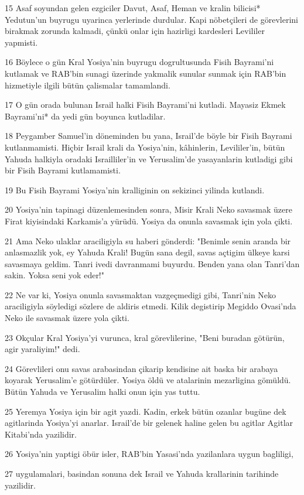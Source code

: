 \par 15 Asaf soyundan gelen ezgiciler Davut, Asaf, Heman ve kralin bilicisi* Yedutun'un buyrugu uyarinca yerlerinde durdular. Kapi nöbetçileri de görevlerini birakmak zorunda kalmadi, çünkü onlar için hazirligi kardesleri Levililer yapmisti.
\par 16 Böylece o gün Kral Yosiya'nin buyrugu dogrultusunda Fisih Bayrami'ni kutlamak ve RAB'bin sunagi üzerinde yakmalik sunular sunmak için RAB'bin hizmetiyle ilgili bütün çalismalar tamamlandi.
\par 17 O gün orada bulunan Israil halki Fisih Bayrami'ni kutladi. Mayasiz Ekmek Bayrami'ni* da yedi gün boyunca kutladilar.
\par 18 Peygamber Samuel'in döneminden bu yana, Israil'de böyle bir Fisih Bayrami kutlanmamisti. Hiçbir Israil krali da Yosiya'nin, kâhinlerin, Levililer'in, bütün Yahuda halkiyla oradaki Israilliler'in ve Yerusalim'de yasayanlarin kutladigi gibi bir Fisih Bayrami kutlamamisti.
\par 19 Bu Fisih Bayrami Yosiya'nin kralliginin on sekizinci yilinda kutlandi.
\par 20 Yosiya'nin tapinagi düzenlemesinden sonra, Misir Krali Neko savasmak üzere Firat kiyisindaki Karkamis'a yürüdü. Yosiya da onunla savasmak için yola çikti.
\par 21 Ama Neko ulaklar araciligiyla su haberi gönderdi: "Benimle senin aranda bir anlasmazlik yok, ey Yahuda Krali! Bugün sana degil, savas açtigim ülkeye karsi savasmaya geldim. Tanri ivedi davranmami buyurdu. Benden yana olan Tanri'dan sakin. Yoksa seni yok eder!"
\par 22 Ne var ki, Yosiya onunla savasmaktan vazgeçmedigi gibi, Tanri'nin Neko araciligiyla söyledigi sözlere de aldiris etmedi. Kilik degistirip Megiddo Ovasi'nda Neko ile savasmak üzere yola çikti.
\par 23 Okçular Kral Yosiya'yi vurunca, kral görevlilerine, "Beni buradan götürün, agir yaraliyim!" dedi.
\par 24 Görevlileri onu savas arabasindan çikarip kendisine ait baska bir arabaya koyarak Yerusalim'e götürdüler. Yosiya öldü ve atalarinin mezarligina gömüldü. Bütün Yahuda ve Yerusalim halki onun için yas tuttu.
\par 25 Yeremya Yosiya için bir agit yazdi. Kadin, erkek bütün ozanlar bugüne dek agitlarinda Yosiya'yi anarlar. Israil'de bir gelenek haline gelen bu agitlar Agitlar Kitabi'nda yazilidir.
\par 26 Yosiya'nin yaptigi öbür isler, RAB'bin Yasasi'nda yazilanlara uygun bagliligi,
\par 27 uygulamalari, basindan sonuna dek Israil ve Yahuda krallarinin tarihinde yazilidir.

